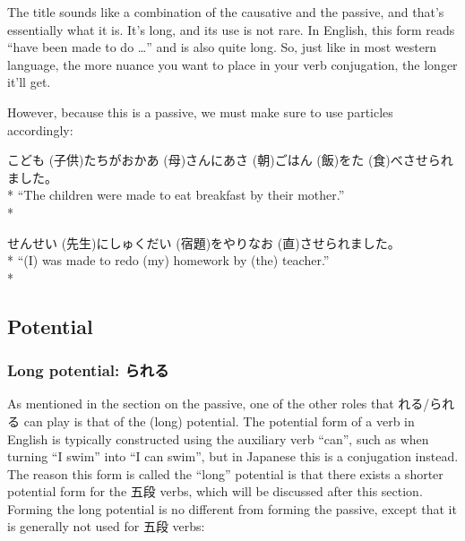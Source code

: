 \documentclass[11pt, b5paper, twoside, openright, onecolumn]{book}
\makeatletter
\newcommand*{\rubystack}[2]{{\relscale{0.5}%
  \begin{tabular}[b]{@{}c@{}}%
    {#1}\\%
   {\textscale{2}{#2}}%
  \end{tabular}}%
}
\DeclareRobustCommand*{\ruby}[2]{%
  \mbox{%
    \setlength{\parskip}{0ex}%
    \BeginAccSupp{method=pdfstringdef,ActualText={#1}}%
      \rubystack{\phantom{#2}}{#1}%
      \llap{%
        \rubystack{#2}{\phantom{#1}}%
      }%
    \EndAccSupp{}%
  }%
}
\renewcommand*{\ruby}[2]{#2 (#1)}%
\newenvironment{exampleblock}{
\setlength{\parindent}{0.6in}
\begin{minipage}[t]{\dimexpr\textwidth-\parindent}}
{\end{minipage}}
\makeatother
\begin{document}
The title sounds like a combination of the causative and the passive‚ and that’s essentially what it is. It’s long‚ and its use is not rare. In English‚ this form reads “have been made to do …” and is also quite long. So‚ just like in most western language‚ the more nuance you want to place in your verb conjugation‚ the longer it’ll get.

However‚ because this is a passive‚ we must make sure to use particles accordingly:

\vspace{0.4cm}
\begin{exampleblock}
\ruby{子供}{こども}たちがお\ruby{母}{かあ}さんに\ruby{朝}{あさ}ご\ruby{飯}{はん}を\ruby{食}{た}べさせられました。 \\* 
“The children were made to eat breakfast by their mother.” \\* 
\end{exampleblock}
\vspace{0.2cm}

\begin{exampleblock}
\ruby{先生}{せんせい}に\ruby{宿題}{しゅくだい}をやり\ruby{直}{なお}させられました。 \\* 
“(I) was made to redo (my) homework by (the) teacher.” \\* 
\end{exampleblock}
\subsection{Potential}


\subsubsection{Long potential: られる}

As mentioned in the section on the passive‚ one of the other roles that れる/られる can play is that of the (long) potential. The potential form of a verb in English is typically constructed using the auxiliary verb “can”‚ such as when turning “I swim” into “I can swim”‚ but in Japanese this is a conjugation instead. The reason this form is called the “long” potential is that there exists a shorter potential form for the 五段 verbs‚ which will be discussed after this section. Forming the long potential is no different from forming the passive‚ except that it is generally not used for 五段 verbs:
\end{document}
